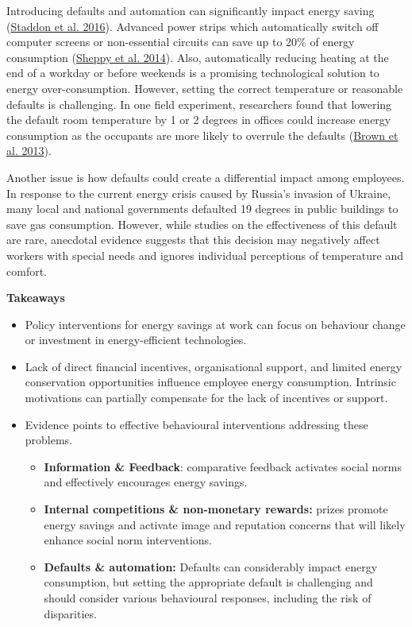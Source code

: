 \documentclass[
  11pt,
]{article}
\begin{document}
Introducing defaults and automation can significantly impact energy
saving (\protect\hyperlink{ref-staddon2016intervening}{Staddon et al.
2016}). Advanced power strips which automatically switch off computer
screens or non-essential circuits can save up to 20\% of energy
consumption (\protect\hyperlink{ref-sheppy2014reducing}{Sheppy et al.
2014}). Also, automatically reducing heating at the end of a workday or
before weekends is a promising technological solution to energy
over-consumption. However, setting the correct temperature or reasonable
defaults is challenging. In one field experiment, researchers found that
lowering the default room temperature by 1 or 2 degrees in offices could
increase energy consumption as the occupants are more likely to overrule
the defaults (\protect\hyperlink{ref-brown2013testing}{Brown et al.
2013}).

Another issue is how defaults could create a differential impact among
employees. In response to the current energy crisis caused by Russia's
invasion of Ukraine, many local and national governments defaulted 19
degrees in public buildings to save gas consumption. However, while
studies on the effectiveness of this default are rare, anecdotal
evidence suggests that this decision may negatively affect workers with
special needs and ignores individual perceptions of temperature and
comfort.

\textbf{Takeaways}

\begin{itemize}
\item
  Policy interventions for energy savings at work can focus on behaviour
  change or investment in energy-efficient technologies.
\item
  Lack of direct financial incentives, organisational support, and
  limited energy conservation opportunities influence employee energy
  consumption. Intrinsic motivations can partially compensate for the
  lack of incentives or support.
\item
  Evidence points to effective behavioural interventions addressing
  these problems.

  \begin{itemize}
  \item
    \textbf{Information \& Feedback}: comparative feedback activates
    social norms and effectively encourages energy savings.
  \item
    \textbf{Internal competitions \& non-monetary rewards:} prizes
    promote energy savings and activate image and reputation concerns
    that will likely enhance social norm interventions.
  \item
    \textbf{Defaults \& automation:} Defaults can considerably impact
    energy consumption, but setting the appropriate default is
    challenging and should consider various behavioural responses,
    including the risk of disparities.
  \end{itemize}
\end{itemize}
\end{document}
